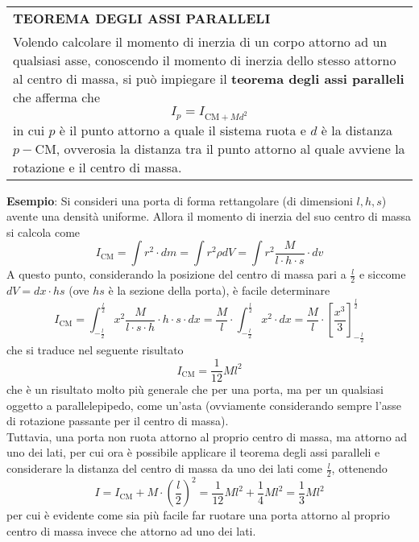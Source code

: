 \documentclass[a4paper]{extarticle}
\renewcommand\arraystretch{}
\begin{document}
\vspace{1em}
\setlength{\tabcolsep}{14pt}
\renewcommand{\arraystretch}{2}
\noindent
\begin{tabularx}{\textwidth}{@{}|P|@{}}
    \hline
    {\textbf{TEOREMA DEGLI ASSI PARALLELI}}\\
    \parbox{\linewidth}{Volendo calcolare il momento di inerzia di un corpo attorno ad un qualsiasi asse, conoscendo il momento di inerzia dello stesso attorno al centro di massa, si può impiegare il \textbf{teorema degli assi paralleli} che afferma che
    \[\boxed{I_p = I_{\text{CM} + Md^2}}\]
    in cui $p$ è il punto attorno a quale il sistema ruota e $d$ è la distanza $p-\text{CM}$, ovverosia la distanza tra il punto attorno al quale avviene la rotazione e il centro di massa.
    \vspace{3mm}}\\
    \hline
\end{tabularx}

\vspace{2em}
\noindent
\textbf{Esempio}: Si consideri una porta di forma rettangolare (di dimensioni $l,h,s$) avente una densità uniforme. Allora il momento di inerzia del suo centro di massa si calcola come
\[I_{\text{CM}}=\int r^2 \cdot dm = \int r^2 \rho dV = \int r^2 \frac{M}{l \cdot h \cdot s} \cdot dv\]
A questo punto, considerando la posizione del centro di massa pari a $\frac{l}{2}$ e siccome $dV = dx \cdot hs$ (ove $hs$ è la sezione della porta), è facile determinare
\[I_{\text{CM}}=\int_{-\frac{l}{2}}^{\frac{l}{2}} x^2 \frac{M}{l \cdot s \cdot h} \cdot h \cdot s \cdot dx = \frac{M}{l} \cdot \int_{-\frac{l}{2}}^{\frac{l}{2}} x^2 \cdot dx = \frac{M}{l} \cdot \left[\frac{x^3}{3}\right]_{-\frac{l}{2}}^{\frac{l}{2}}\]
che si traduce nel seguente risultato
\[\boxed{I_{\text{CM}} = \frac{1}{12}Ml^2}\]
che è un risultato molto più generale che per una porta, ma per un qualsiasi oggetto a parallelepipedo, come un'asta (ovviamente considerando sempre l'asse di rotazione passante per il centro di massa).\\
Tuttavia, una porta non ruota attorno al proprio centro di massa, ma attorno ad uno dei lati, per cui ora è possibile applicare il teorema degli assi paralleli e considerare la distanza del centro di massa da uno dei lati come $\frac{l}{2}$, ottenendo
\[\boxed{I=I_{\text{CM}}+M \cdot \left(\frac{l}{2}\right)^2=\frac{1}{12}Ml^2+\frac{1}{4}Ml^2=\frac{1}{3}Ml^2}\]
per cui è evidente come sia più facile far ruotare una porta attorno al proprio centro di massa invece che attorno ad uno dei lati.
\end{document}
